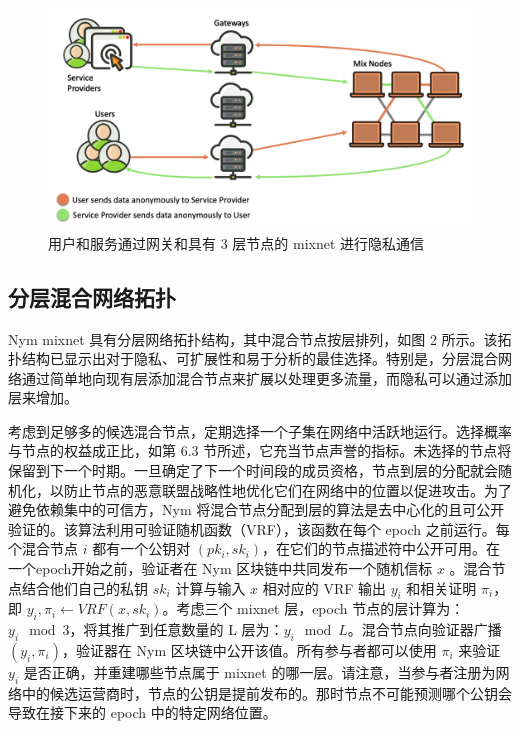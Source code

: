 \documentclass{article}
\begin{document}
\begin{figure}
\centering
\includegraphics[width=1\textwidth]{image2.png} %
\caption{用户和服务通过网关和具有 3 层节点的 mixnet 进行隐私通信} %
\label{图 2} %
\end{figure}

	\subsection{分层混合网络拓扑}
	
	Nym mixnet 具有分层网络拓扑结构，其中混合节点按层排列，如图 2 所示。该拓扑结构已显示出对于隐私、可扩展性和易于分析的最佳选择\cite{ref7, ref36}。特别是，分层混合网络通过简单地向现有层添加混合节点来扩展以处理更多流量，而隐私可以通过添加层来增加。\newline

	考虑到足够多的候选混合节点，定期选择一个子集在网络中活跃地运行。选择概率与节点的权益成正比，如第 6.3 节所述，它充当节点声誉的指标。未选择的节点将保留到下一个时期。一旦确定了下一个时间段的成员资格，节点到层的分配就会随机化，以防止节点的恶意联盟战略性地优化它们在网络中的位置以促进攻击。为了避免依赖集中的可信方，Nym 将混合节点分配到层的算法是去中心化的且可公开验证的。该算法利用可验证随机函数（VRF）\cite{ref80}，该函数在每个 epoch 之前运行。每个混合节点 $i$ 都有一个公钥对 $\left ( pk_{i}, sk_{i} \right )$，在它们的节点描述符中公开可用。在一个epoch开始之前，验证者在 Nym 区块链中共同发布一个随机信标 $x$ 。混合节点结合他们自己的私钥 $sk_{i}$ 计算与输入 $x$ 相对应的 VRF 输出 $y_{i}$ 和相关证明 $\pi_{i}$，即 $y_{i},\pi_{i}\leftarrow VRF(x,sk_{i})$。考虑三个 mixnet 层，epoch 节点的层计算为：$y_{i} \mod 3$，将其推广到任意数量的 L 层为：$y_{i} \mod L$。混合节点向验证器广播 $(y_{i}, \pi_{i})$，验证器在 Nym 区块链中公开该值。所有参与者都可以使用 $\pi_{i}$ 来验证 $y_{i}$ 是否正确，并重建哪些节点属于 mixnet 的哪一层。请注意，当参与者注册为网络中的候选运营商时，节点的公钥是提前发布的。那时节点不可能预测哪个公钥会导致在接下来的 epoch 中的特定网络位置。\newline
\end{document}
